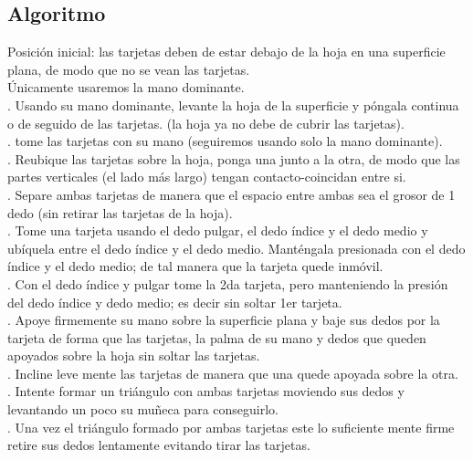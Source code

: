 \documentclass{article}
\begin{document}
\subsection{Algoritmo}
Posición inicial: las tarjetas deben de estar debajo de la hoja en una superficie plana, de modo que no se vean las tarjetas.\\
\newline
Únicamente usaremos la mano dominante.\\
. Usando su mano dominante, levante la hoja de la superficie y póngala continua o de seguido de las tarjetas. (la hoja ya no debe de cubrir las tarjetas).\\
. tome las tarjetas con su mano (seguiremos usando solo la mano dominante).\\
. Reubique las tarjetas sobre la hoja, ponga una junto a la otra, de modo que las partes verticales (el lado más largo) tengan contacto-coincidan entre si.\\
. Separe ambas tarjetas de manera que el espacio entre ambas sea el grosor de 1 dedo (sin retirar las tarjetas de la hoja).\\
.	Tome una tarjeta usando el dedo pulgar, el dedo índice y el dedo medio y ubíquela entre el dedo índice y el dedo medio. Manténgala presionada con el dedo índice y el dedo medio; de tal manera que la tarjeta quede inmóvil.\\
.	Con el dedo índice y pulgar tome la 2da tarjeta, pero manteniendo la presión del dedo índice y dedo medio; es decir sin soltar 1er tarjeta.\\
.	Apoye firmemente su mano sobre la superficie plana y baje sus dedos por la tarjeta de forma que las tarjetas, la palma de su mano y dedos que queden apoyados sobre la hoja sin soltar las tarjetas.\\
.	Incline leve mente las tarjetas de manera que una quede apoyada sobre la otra.\\
.	Intente formar un triángulo con ambas tarjetas moviendo sus dedos y levantando un poco su muñeca para conseguirlo.\\
.	Una vez el triángulo formado por ambas tarjetas este lo suficiente mente firme retire sus dedos lentamente evitando tirar las tarjetas.\\
\newline
\end{document}
